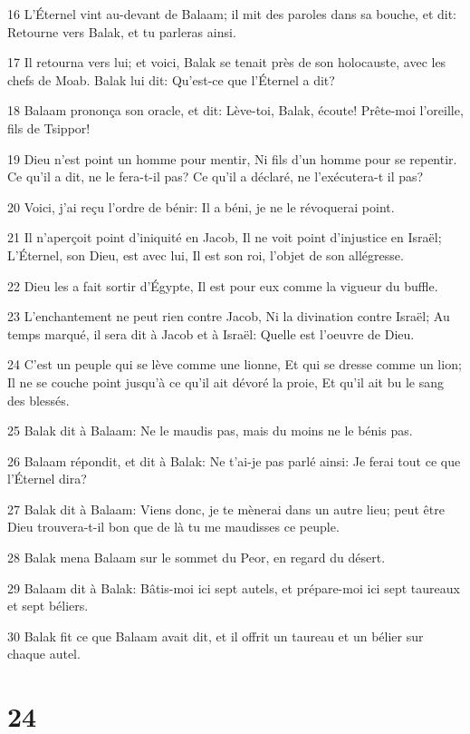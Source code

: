 \par 16 L'Éternel vint au-devant de Balaam; il mit des paroles dans sa bouche, et dit: Retourne vers Balak, et tu parleras ainsi.
\par 17 Il retourna vers lui; et voici, Balak se tenait près de son holocauste, avec les chefs de Moab. Balak lui dit: Qu'est-ce que l'Éternel a dit?
\par 18 Balaam prononça son oracle, et dit: Lève-toi, Balak, écoute! Prête-moi l'oreille, fils de Tsippor!
\par 19 Dieu n'est point un homme pour mentir, Ni fils d'un homme pour se repentir. Ce qu'il a dit, ne le fera-t-il pas? Ce qu'il a déclaré, ne l'exécutera-t il pas?
\par 20 Voici, j'ai reçu l'ordre de bénir: Il a béni, je ne le révoquerai point.
\par 21 Il n'aperçoit point d'iniquité en Jacob, Il ne voit point d'injustice en Israël; L'Éternel, son Dieu, est avec lui, Il est son roi, l'objet de son allégresse.
\par 22 Dieu les a fait sortir d'Égypte, Il est pour eux comme la vigueur du buffle.
\par 23 L'enchantement ne peut rien contre Jacob, Ni la divination contre Israël; Au temps marqué, il sera dit à Jacob et à Israël: Quelle est l'oeuvre de Dieu.
\par 24 C'est un peuple qui se lève comme une lionne, Et qui se dresse comme un lion; Il ne se couche point jusqu'à ce qu'il ait dévoré la proie, Et qu'il ait bu le sang des blessés.
\par 25 Balak dit à Balaam: Ne le maudis pas, mais du moins ne le bénis pas.
\par 26 Balaam répondit, et dit à Balak: Ne t'ai-je pas parlé ainsi: Je ferai tout ce que l'Éternel dira?
\par 27 Balak dit à Balaam: Viens donc, je te mènerai dans un autre lieu; peut être Dieu trouvera-t-il bon que de là tu me maudisses ce peuple.
\par 28 Balak mena Balaam sur le sommet du Peor, en regard du désert.
\par 29 Balaam dit à Balak: Bâtis-moi ici sept autels, et prépare-moi ici sept taureaux et sept béliers.
\par 30 Balak fit ce que Balaam avait dit, et il offrit un taureau et un bélier sur chaque autel.

\chapter{24}

